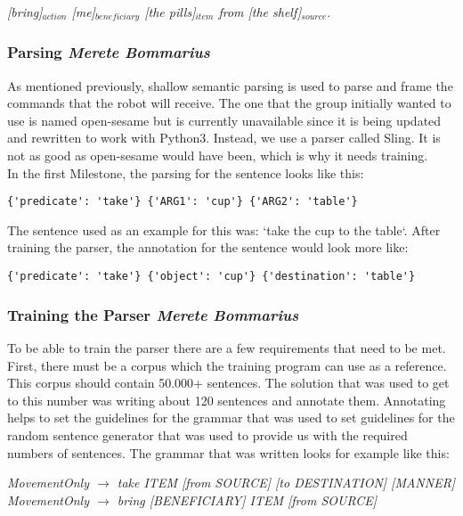 \documentclass[main.tex]{subfiles}
\begin{document}
            \textit{ [bring]$_{action}$  [me]$_{beneficiary}$ [the pills]$_{item}$ from [the shelf]$_{source}.$}
        \subsubsection{Parsing \small{\textit{Merete Bommarius}}}     
            As mentioned previously, shallow semantic parsing is used to parse and frame the commands that the robot will receive. The one that the group initially wanted to use is named open-sesame but is currently unavailable since it is being updated and rewritten to work with Python3. Instead, we use a parser called Sling. It is not as good as open-sesame would have been, which is why it needs training.\\ 
            In the first Milestone, the parsing for the sentence looks like this:
    
\begin{lstlisting}
{'predicate': 'take'} {'ARG1': 'cup'} {'ARG2': 'table'}
\end{lstlisting}
            
            The sentence used as an example for this was: ‘take the cup to the table‘. After training the parser, the annotation for the sentence would look more like:
            
\begin{lstlisting}
{'predicate': 'take'} {'object': 'cup'} {'destination': 'table'}
\end{lstlisting}
            
        \subsubsection{Training the Parser \small{\textit{Merete Bommarius}}}
            To be able to train the parser there are a few requirements that need to be met. First, there must be a corpus which the training program can use as a reference. This corpus should contain 50.000+ sentences. The solution that was used to get to this number was writing about 120 sentences and annotate them. Annotating helps to set the guidelines for the grammar that was used to set guidelines for the random sentence generator that was used to provide us with the required numbers of sentences.
            The grammar that was written looks for example like this:
            
            
\textit{MovementOnly $\rightarrow$ take ITEM [from SOURCE] [to DESTINATION] [MANNER]\\
                MovementOnly $\rightarrow$ bring [BENEFICIARY] ITEM [from SOURCE]}
                
\end{document}
